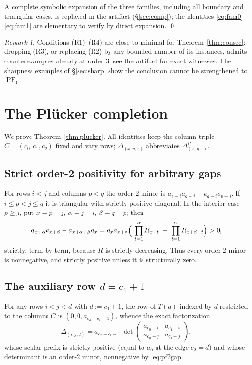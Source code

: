 \documentclass[11pt]{amsart}
\theoremstyle{definition}
\theoremstyle{remark}
\newtheorem{remark}[theorem]{Remark}
\DeclareMathOperator{\PF}{PF}
\newcommand{\minor}[2]{\Delta_{#1}^{#2}}
\begin{document}
A complete symbolic expansion of the three families, including all
boundary and triangular cases, is replayed in the artifact
(\S\ref{sec:comp}); the identities \eqref{eq:fam0}--\eqref{eq:fam1} are
elementary to verify by direct expansion. \qed

\begin{remark}
Conditions (R1)--(R4) are close to minimal for
Theorem~\ref{thm:consec}: dropping (R3), or replacing (R2) by any
bounded number of its instances, admits counterexamples already at
order $3$; see the artifact for exact witnesses. The sharpness examples
of \S\ref{sec:sharp} show the conclusion cannot be strengthened to
$\PF_4$.
\end{remark}

\section{The \texorpdfstring{Pl\"ucker}{Plucker} completion}\label{sec:plucker}

We prove Theorem~\ref{thm:plucker}. All identities keep the column
triple $C=(c_0,c_1,c_2)$ fixed and vary rows; $\minor{(x,y,z)}{}$
abbreviates $\minor{(x,y,z)}{C}$.

\subsection{Strict order-2 positivity for arbitrary gaps}
For rows $i<j$ and columns $p<q$ the order-$2$ minor is
$a_{p-i}a_{q-j}-a_{q-i}a_{p-j}$. If $i\le p<j\le q$ it is triangular
with strictly positive diagonal. In the interior case $p\ge j$, put
$x=p-j$, $\alpha=j-i$, $\beta=q-p$; then
\begin{equation}\label{eq:pf2gap}
a_{x+\alpha}a_{x+\beta}-a_{x+\alpha+\beta}a_{x}
= a_x a_{x+\beta}\Bigl(\ \prod_{t=1}^{\alpha}R_{x+t}
\;-\;\prod_{t=1}^{\alpha}R_{x+\beta+t}\Bigr)>0,
\end{equation}
strictly, term by term, because $R$ is strictly decreasing. Thus every
order-$2$ minor is nonnegative, and strictly positive unless it is
structurally zero.

\subsection{The auxiliary row \texorpdfstring{$d=c_1+1$}{d = c1 + 1}}
For any rows $i<j<d$ with $d:=c_1+1$, the row of $T(a)$ indexed by $d$
restricted to the columns $C$ is $(0,0,a_{c_2-c_1-1})$, whence the
exact factorization
\begin{equation}\label{eq:drow}
\minor{(i,j,d)}{}
= a_{c_2-c_1-1}\,
\det\begin{pmatrix} a_{c_0-i}&a_{c_1-i}\\ a_{c_0-j}&a_{c_1-j}
\end{pmatrix},
\end{equation}
whose scalar prefix is strictly positive (equal to $a_0$ at the edge
$c_2=d$) and whose determinant is an order-$2$ minor, nonnegative by
\eqref{eq:pf2gap}.
\end{document}

